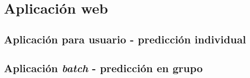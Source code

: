\chapter{Aplicación web}

\section{Aplicación para usuario - predicción individual}

\section{Aplicación \textit{batch} - predicción en grupo}